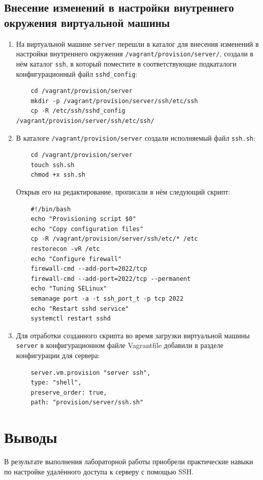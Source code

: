 \subsection{Внесение изменений в настройки внутреннего окружения виртуальной машины}
\begin{enumerate}
\item На виртуальной машине \texttt{server} перешли в каталог для внесения изменений в настройки внутреннего окружения \texttt{/vagrant/provision/server/}, создали в нём каталог \texttt{ssh}, в который поместите в соответствующие подкаталоги конфигурационный файл \texttt{sshd\_config}:
  \begin{verbatim}
    cd /vagrant/provision/server
    mkdir -p /vagrant/provision/server/ssh/etc/ssh
    cp -R /etc/ssh/sshd_config /vagrant/provision/server/ssh/etc/ssh/
  \end{verbatim}
\item В каталоге \texttt{/vagrant/provision/server} создали исполняемый файл \texttt{ssh.sh}:
  \begin{verbatim}
    cd /vagrant/provision/server
    touch ssh.sh
    chmod +x ssh.sh
  \end{verbatim}
  Открыв его на редактирование, прописали в нём следующий скрипт:
  \begin{verbatim}
    #!/bin/bash
    echo "Provisioning script $0"
    echo "Copy configuration files"
    cp -R /vagrant/provision/server/ssh/etc/* /etc
    restorecon -vR /etc
    echo "Configure firewall"
    firewall-cmd --add-port=2022/tcp
    firewall-cmd --add-port=2022/tcp --permanent
    echo "Tuning SELinux"
    semanage port -a -t ssh_port_t -p tcp 2022
    echo "Restart sshd service"
    systemctl restart sshd
  \end{verbatim}
\item Для отработки созданного скрипта во время загрузки виртуальной машины \texttt{server} в конфигурационном файле Vagrantfile добавили в разделе конфигурации для сервера:
  \begin{verbatim}
    server.vm.provision "server ssh",
    type: "shell",
    preserve_order: true,
    path: "provision/server/ssh.sh"
  \end{verbatim}
\end{enumerate}


\section{Выводы}
В результате выполнения лабораторной работы приобрели практические навыки по настройке удалённого доступа к серверу с помощью SSH.

